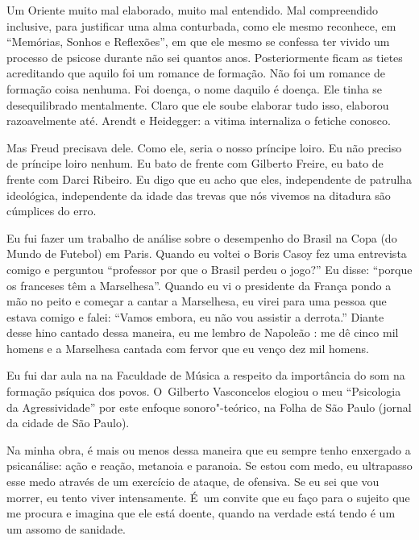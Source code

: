  

Um Oriente muito mal elaborado, muito mal entendido. Mal compreendido
inclusive, para justificar uma alma conturbada, como ele mesmo
reconhece, em ``Memórias, Sonhos e Reflexões'', em que ele mesmo se
confessa ter vivido um processo de psicose durante não sei quantos anos.
Posteriormente ficam as tietes acreditando que aquilo foi um romance de
formação. Não foi um romance de formação coisa nenhuma. Foi doença, o
nome daquilo é doença. Ele tinha se desequilibrado mentalmente. Claro
que ele soube elaborar tudo isso, elaborou razoavelmente até. Arendt e
Heidegger: a vitima internaliza o fetiche conosco.

 

Mas Freud precisava dele. Como ele, seria o nosso príncipe loiro. Eu não
preciso de príncipe loiro nenhum. Eu bato de frente com Gilberto Freire,
eu bato de frente com Darci Ribeiro. Eu digo que eu acho 
que eles, independente de patrulha
ideológica, independente da idade das trevas que nós vivemos na ditadura
são cúmplices do erro.

 

Eu fui fazer um trabalho de análise sobre o desempenho do Brasil na Copa
(do Mundo de Futebol) em Paris. Quando eu voltei o Boris Casoy fez uma
entrevista comigo e perguntou ``professor por que o Brasil perdeu o
jogo?'' Eu disse: ``porque os franceses têm a Marselhesa''. Quando eu vi
o presidente da França pondo a mão no peito e começar a cantar a
Marselhesa, eu virei para uma pessoa que estava comigo e falei: ``Vamos
embora, eu não vou assistir a derrota.'' Diante desse hino cantado dessa
maneira, eu me lembro de Napoleão : me dê cinco mil homens e a
Marselhesa cantada com fervor que eu venço dez mil homens.

 

Eu fui dar aula na  na Faculdade de Música a respeito da importância
do som na formação psíquica dos povos. O~Gilberto Vasconcelos elogiou o
meu ``Psicologia da Agressividade'' por este enfoque sonoro"-teórico, na
Folha de São Paulo (jornal da cidade de São Paulo).

 

Na minha obra, é mais ou menos dessa maneira que eu sempre tenho
enxergado a psicanálise: ação e reação, metanoia e paranoia. Se estou
com medo, eu ultrapasso esse medo através de um exercício de ataque, de
ofensiva. Se eu sei que vou morrer, eu tento viver intensamente. É~um
convite que eu faço para o sujeito que me procura e imagina que ele está
doente, quando na verdade está tendo é um um assomo de sanidade.

